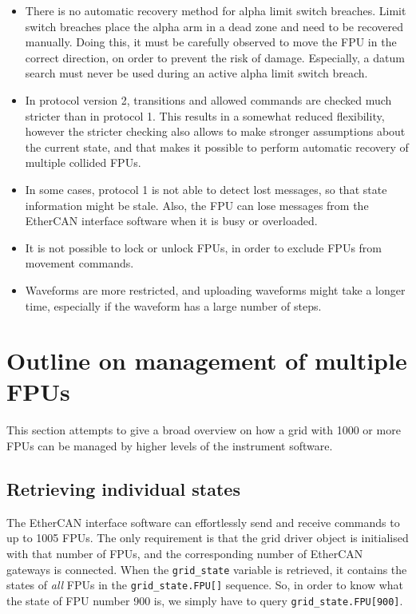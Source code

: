 \documentclass[11pt,a4paper]{report}
\begin{document}
\begin{itemize}
\item There is no automatic recovery method for alpha limit switch
  breaches. Limit switch breaches place the alpha arm in a dead zone
  and need to be recovered manually. Doing this, it must be carefully
  observed to move the FPU in the correct direction, on order to
  prevent the risk of damage. Especially, a datum search must never be
  used during an active alpha limit switch breach.

\item In protocol version 2, transitions and allowed commands are
  checked much stricter than in protocol 1.  This results in a
  somewhat reduced flexibility, however the stricter checking also
  allows to make stronger assumptions about the current state, and
  that makes it possible to perform automatic recovery of multiple
  collided FPUs.
  
\item In some cases, protocol 1 is not able to detect lost messages,
  so that state information might be stale. Also, the FPU can lose
  messages from the EtherCAN interface software when it is busy or overloaded. 
  

\item It is not possible to lock or unlock FPUs, in order to exclude
  FPUs from movement commands.
  
\item Waveforms are more restricted, and uploading waveforms might
  take a longer time, especially if the waveform has a large number of
  steps.
  
\end{itemize}

\section{Outline on management of multiple FPUs}
\label{sec:multifpu}
This section attempts to give a broad overview on how a grid with 1000
or more FPUs can be managed by higher levels of the instrument
software.

\subsection{Retrieving individual states}
The EtherCAN interface software can effortlessly send and receive commands to up
to 1005 FPUs. The only requirement is that the grid driver object is
initialised with that number of FPUs, and the corresponding number of
EtherCAN gateways is connected. When the \texttt{grid\_state} variable
is retrieved, it contains the states of \emph{all} FPUs in the
\verb+grid_state.FPU[]+ sequence. So, in order to know what the state
of FPU number 900 is, we simply have to query
\verb+grid_state.FPU[900]+.
\end{document}
